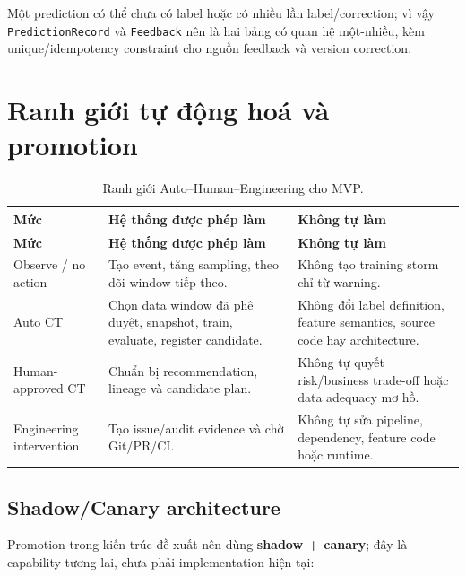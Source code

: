 \documentclass[11pt,a4paper]{article}
\newcommand{\codepath}[1]{\texttt{\small #1}}
\begin{document}
Một prediction có thể chưa có label hoặc có nhiều lần label/correction; vì vậy \codepath{PredictionRecord} và \codepath{Feedback} nên là hai bảng có quan hệ một-nhiều, kèm unique/idempotency constraint cho nguồn feedback và version correction.

\section{Ranh giới tự động hoá và promotion}

\begin{longtable}{@{}P{2.7cm}P{4.9cm}P{4.9cm}@{}}
\caption{Ranh giới Auto--Human--Engineering cho MVP.}\label{tab:boundaries}\\
\toprule
\textbf{Mức} & \textbf{Hệ thống được phép làm} & \textbf{Không tự làm} \\
\midrule
\endfirsthead
\toprule
\textbf{Mức} & \textbf{Hệ thống được phép làm} & \textbf{Không tự làm} \\
\midrule
\endhead
Observe / no action & Tạo event, tăng sampling, theo dõi window tiếp theo. & Không tạo training storm chỉ từ warning. \\
Auto CT & Chọn data window đã phê duyệt, snapshot, train, evaluate, register candidate. & Không đổi label definition, feature semantics, source code hay architecture. \\
Human-approved CT & Chuẩn bị recommendation, lineage và candidate plan. & Không tự quyết risk/business trade-off hoặc data adequacy mơ hồ. \\
Engineering intervention & Tạo issue/audit evidence và chờ Git/PR/CI. & Không tự sửa pipeline, dependency, feature code hoặc runtime. \\
\bottomrule
\end{longtable}

\subsection{Shadow/Canary architecture}\label{subsec:shadow-canary}

Promotion trong kiến trúc đề xuất nên dùng \textbf{shadow + canary}; đây là capability tương lai, chưa phải implementation hiện tại:
\end{document}
